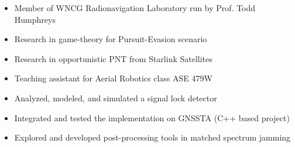 \documentclass[11pt,a4paper,ragged2e,twocolumn]{altacv}
\begin{document}
\tagline{}


\twocolumn[
    \begin{@twocolumnfalse}
        \begin{center}

            \begin{fullwidth}
                \makecvheader
            \end{fullwidth}

        \end{center}
    \end{@twocolumnfalse}
]


\begin{itemize}
    \item Member of WNCG Radionavigation Laboratory run by Prof. Todd Humphreys \\
    \item Research in game-theory for Pursuit-Evasion scenario \\
    \item Research in opportunistic PNT from Starlink Satellites \\
    \item Teaching assistant for Aerial Robotics class ASE 479W \\
\end{itemize}

\divider


\begin{itemize}
    \item Analyzed, modeled, and simulated a signal lock detector
    \item Integrated and tested the implementation on GNSSTA (C++ based project)
    \item Explored and developed post-processing tools in matched spectrum jamming
\end{itemize}
\end{document}
